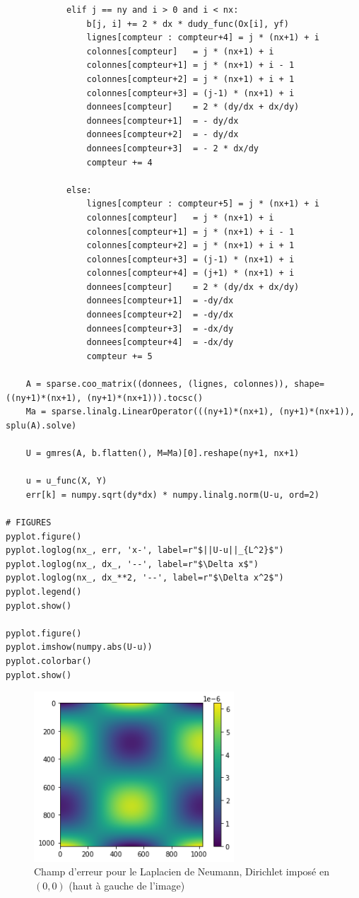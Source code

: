 \begin{verbatim}
            elif j == ny and i > 0 and i < nx:
                b[j, i] += 2 * dx * dudy_func(Ox[i], yf)
                lignes[compteur : compteur+4] = j * (nx+1) + i
                colonnes[compteur]   = j * (nx+1) + i
                colonnes[compteur+1] = j * (nx+1) + i - 1
                colonnes[compteur+2] = j * (nx+1) + i + 1
                colonnes[compteur+3] = (j-1) * (nx+1) + i
                donnees[compteur]    = 2 * (dy/dx + dx/dy)
                donnees[compteur+1]  = - dy/dx
                donnees[compteur+2]  = - dy/dx
                donnees[compteur+3]  = - 2 * dx/dy
                compteur += 4

            else:
                lignes[compteur : compteur+5] = j * (nx+1) + i
                colonnes[compteur]   = j * (nx+1) + i
                colonnes[compteur+1] = j * (nx+1) + i - 1
                colonnes[compteur+2] = j * (nx+1) + i + 1
                colonnes[compteur+3] = (j-1) * (nx+1) + i
                colonnes[compteur+4] = (j+1) * (nx+1) + i
                donnees[compteur]    = 2 * (dy/dx + dx/dy)
                donnees[compteur+1]  = -dy/dx
                donnees[compteur+2]  = -dy/dx
                donnees[compteur+3]  = -dx/dy
                donnees[compteur+4]  = -dx/dy
                compteur += 5

    A = sparse.coo_matrix((donnees, (lignes, colonnes)), shape=((ny+1)*(nx+1), (ny+1)*(nx+1))).tocsc()
    Ma = sparse.linalg.LinearOperator(((ny+1)*(nx+1), (ny+1)*(nx+1)), splu(A).solve)
    
    U = gmres(A, b.flatten(), M=Ma)[0].reshape(ny+1, nx+1)
    
    u = u_func(X, Y)
    err[k] = numpy.sqrt(dy*dx) * numpy.linalg.norm(U-u, ord=2)

# FIGURES
pyplot.figure()
pyplot.loglog(nx_, err, 'x-', label=r"$||U-u||_{L^2}$")
pyplot.loglog(nx_, dx_, '--', label=r"$\Delta x$")
pyplot.loglog(nx_, dx_**2, '--', label=r"$\Delta x^2$")
pyplot.legend()
pyplot.show()

pyplot.figure()
pyplot.imshow(numpy.abs(U-u))
pyplot.colorbar()
pyplot.show()
\end{verbatim}

\begin{figure}[htp]
    \centering
    \includegraphics[width=7.5cm]{Images/stokes/Laplace Neumann 2D/erreur.png}
    \caption{Champ d'erreur pour le Laplacien de Neumann, Dirichlet imposé en $(0,0)$ (haut à gauche de l'image)}
\end{figure}

